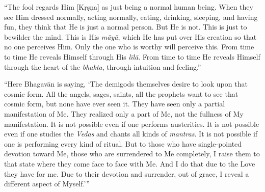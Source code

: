 \enquote{The fool regards Him [Kṛṣṇa] as just being a normal human being. When they see Him dressed normally, acting normally, eating, drinking, sleeping, and having fun, they think that He is just a normal person. But He is not. This is just to bewilder the mind. This is His \textit{māyā}, which He has put over His creation so that no one perceives Him. Only the one who is worthy will perceive this. From time to time He reveals Himself through His \textit{līlā}. From time to time He reveals Himself through the heart of the \textit{bhakta}, through intuition and feeling.}

\enquote{Here Bhagavān is saying, \enquote{The demigods themselves desire to look upon that cosmic form. All the angels, sages, saints, all the prophets want to see that cosmic form, but none have ever seen it. They have seen only a partial manifestation of Me. They realized only a part of Me, not the fullness of My manifestation. It is not possible even if one performs austerities. It is not possible even if one studies the \textit{Vedas} and chants all kinds of \textit{mantras}. It is not possible if one is performing every kind of ritual. But to those who have single-pointed devotion toward Me, those who are surrendered to Me completely, I raise them to that state where they come face to face with Me. And I do that due to the Love they have for me. Due to their devotion and surrender, out of grace, I reveal a different aspect of Myself.}}